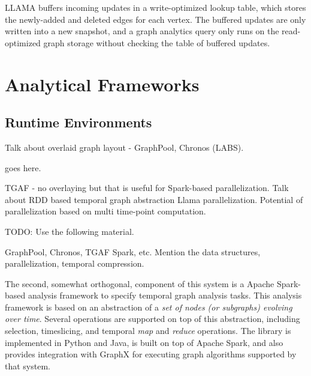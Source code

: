 \documentclass{svjour3}
\begin{document}
LLAMA buffers incoming updates in a write-optimized lookup table, which stores the newly-added and deleted edges for each vertex. The buffered updates are only written into a new snapshot, and a graph analytics query only runs on the read-optimized graph storage without checking the table of buffered updates.





\section{Analytical Frameworks}

\subsection{Runtime Environments}

 Talk about overlaid graph layout - GraphPool, Chronos (LABS).  

 goes here.

 TGAF - no overlaying but that is useful for Spark-based parallelization. Talk about RDD based temporal graph abstraction
Llama parallelization. Potential of parallelization based on multi time-point computation.


TODO: Use the following material.

GraphPool, Chronos, TGAF Spark, etc. Mention the data structures, parallelization, temporal compression.

\vspace{2mm}
 The second, somewhat orthogonal, component of this system is a Apache Spark-based analysis
framework to specify temporal graph analysis tasks. This analysis framework is based on an abstraction of a \textit{set of nodes 
(or subgraphs) evolving over time}. Several operations are supported on top of this abstraction, including selection, timeslicing, and
temporal {\em map} and {\em reduce} operations. The library is implemented in Python and Java, is built on top of Apache Spark, and also provides
integration with GraphX for executing graph algorithms supported by that system.
\end{document}
